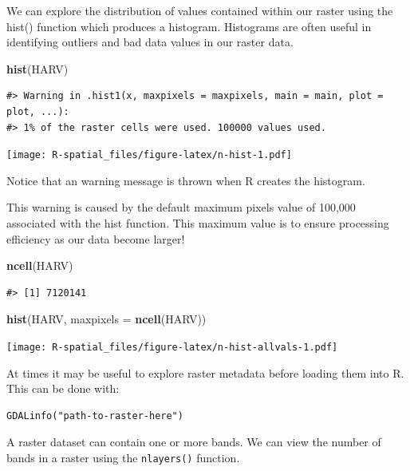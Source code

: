 \documentclass[]{book}
\newenvironment{Shaded}{\begin{snugshade}}{\end{snugshade}}
\newcommand{\KeywordTok}[1]{\textcolor[rgb]{0.13,0.29,0.53}{\textbf{#1}}}
\newcommand{\DataTypeTok}[1]{\textcolor[rgb]{0.13,0.29,0.53}{#1}}
\newcommand{\NormalTok}[1]{#1}
\theoremstyle{definition}
\theoremstyle{definition}
\theoremstyle{definition}
\theoremstyle{remark}
\begin{document}
We can explore the distribution of values contained within our raster
using the hist() function which produces a histogram. Histograms are
often useful in identifying outliers and bad data values in our raster
data.

\begin{Shaded}
\begin{Highlighting}[]
\KeywordTok{hist}\NormalTok{(HARV)}
\end{Highlighting}
\end{Shaded}

\begin{verbatim}
#> Warning in .hist1(x, maxpixels = maxpixels, main = main, plot = plot, ...):
#> 1% of the raster cells were used. 100000 values used.
\end{verbatim}

\texttt{[image: R-spatial\_files/figure-latex/n-hist-1.pdf]}

Notice that an warning message is thrown when R creates the histogram.

This warning is caused by the default maximum pixels value of 100,000
associated with the hist function. This maximum value is to ensure
processing efficiency as our data become larger!

\begin{Shaded}
\begin{Highlighting}[]
\KeywordTok{ncell}\NormalTok{(HARV)}
\end{Highlighting}
\end{Shaded}

\begin{verbatim}
#> [1] 7120141
\end{verbatim}

\begin{Shaded}
\begin{Highlighting}[]
\KeywordTok{hist}\NormalTok{(HARV,}
     \DataTypeTok{maxpixels =} \KeywordTok{ncell}\NormalTok{(HARV))}
\end{Highlighting}
\end{Shaded}

\texttt{[image: R-spatial\_files/figure-latex/n-hist-allvals-1.pdf]}

At times it may be useful to explore raster metadata before loading them
into R. This can be done with:

\begin{verbatim}
GDALinfo("path-to-raster-here") 
\end{verbatim}

A raster dataset can contain one or more bands. We can view the number
of bands in a raster using the \texttt{nlayers()} function.
\end{document}
